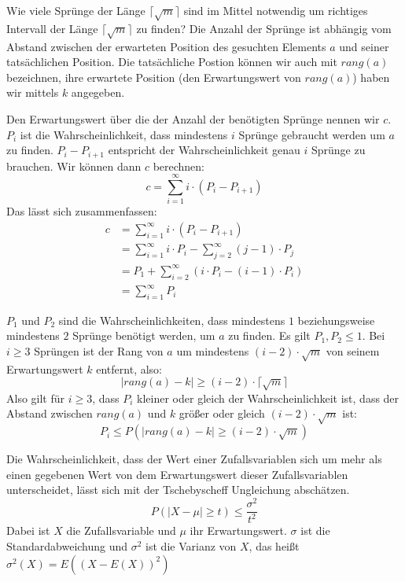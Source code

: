 \begin{Lza}
\hspace{\parindent}Wie viele Sprünge der Länge $\lceil\sqrt{m}\rceil$ sind im Mittel notwendig um richtiges Intervall der Länge $\lceil\sqrt{m}\rceil$ zu finden? Die Anzahl der Sprünge ist abhängig vom Abstand zwischen der erwarteten Position des gesuchten Elements $a$ und seiner tatsächlichen Position. Die tatsächliche Postion können wir auch mit $rang(a)$ bezeichnen, ihre erwartete Position (den Erwartungswert von $rang(a)$) haben wir mittels $k$ angegeben.

Den Erwartungswert über die der Anzahl der benötigten Sprünge nennen wir $c$. $P_i$ ist die Wahrscheinlichkeit, dass mindestens $i$ Sprünge gebraucht werden um $a$ zu finden. $P_i - P_{i+1}$ entspricht der Wahrscheinlichkeit genau $i$ Sprünge zu brauchen. Wir können dann $c$ berechnen:
\[c = \sum_{i=1}^{\infty} i \cdot (P_i - P_{i+1})\]
Das lässt sich zusammenfassen:
\begin{align*}
  c &= \sum_{i=1}^{\infty} i \cdot (P_i - P_{i+1}) \\
    &= \sum_{i=1}^{\infty} i \cdot P_i - \sum_{j=2}^{\infty} (j-1) \cdot P_{j} \\
    &= P_1 + \sum_{i=2}^{\infty} (i \cdot P_i - (i-1) \cdot P_{i}) \\
    &= \sum_{i=1}^{\infty} P_i %
\end{align*}

$P_1$ und $P_2$ sind die Wahrscheinlichkeiten, dass mindestens $1$ beziehungsweise mindestens $2$ Sprünge benötigt werden, um $a$ zu finden. Es gilt $P_1, P_2 \le 1$. Bei $i \ge 3$ Sprüngen ist der Rang von $a$ um mindestens $(i-2) \cdot \sqrt{m}$ von seinem Erwartungswert $k$ entfernt, also:
\[ |rang(a) -k| \ge (i-2) \cdot \lceil\sqrt{m}\rceil \]
Also gilt für $i \ge 3$, dass $P_i$ kleiner oder gleich der Wahrscheinlichkeit ist, dass der Abstand zwischen $rang(a)$ und $k$ größer oder gleich $(i-2) \cdot \sqrt{m}$ ist:
\[ P_i \le P(|rang(a) - k| \ge (i-2) \cdot \sqrt{m}) \]

Die Wahrscheinlichkeit, dass der Wert einer Zufallsvariablen sich um mehr als einen gegebenen Wert von dem Erwartungswert dieser Zufallsvariablen unterscheidet, lässt sich mit der Tschebyscheff Ungleichung abschätzen.
\[ P(|X - \mu| \ge t) \le \frac{\sigma^2}{t^2} \]
Dabei ist $X$ die Zufallsvariable und $\mu$ ihr Erwartungswert. $\sigma$ ist die Standardabweichung und $\sigma^2$ ist die Varianz von $X$, das heißt $\sigma^2 (X) = E((X-E(X))^2)$


\end{Lza}
